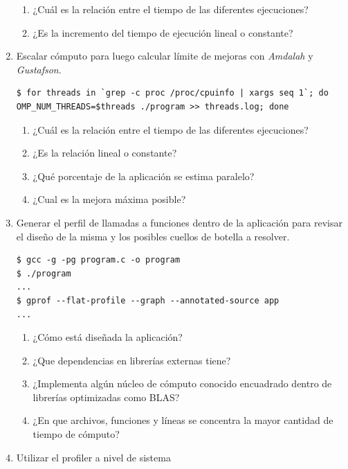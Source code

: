 \documentclass[a4paper]{report}
\begin{document}
\begin{enumerate}
\begin{enumerate}
\item ¿Cuál es la relación entre el tiempo de las diferentes ejecuciones?
\item ¿Es la incremento del tiempo de ejecución lineal o constante?
\end{enumerate}

\item Escalar cómputo para luego calcular límite de mejoras con {\it Amdalah} y {\it Gustafson}.

\begin{lstlisting}[caption={Escalamiento de Cómputo},label={lst:proc}]
$ for threads in `grep -c proc /proc/cpuinfo | xargs seq 1`; do OMP_NUM_THREADS=$threads ./program >> threads.log; done
\end{lstlisting}

\begin{enumerate}
\item ¿Cuál es la relación entre el tiempo de las diferentes ejecuciones?
\item ¿Es la relación lineal o constante?
\item ¿Qué porcentaje de la aplicación se estima paralelo?
\item ¿Cual es la mejora máxima posible?
\end{enumerate}

\item Generar el perfil de llamadas a funciones dentro de la aplicación para revisar el diseño de la misma y los posibles cuellos de botella a resolver.

\begin{lstlisting}[caption={Generación de Perfil de Rendimiento},label={lst:gprofall}]
$ gcc -g -pg program.c -o program
$ ./program
...
$ gprof --flat-profile --graph --annotated-source app
...
\end{lstlisting}

\begin{enumerate}
\item ¿Cómo está diseñada la aplicación?
\item ¿Que dependencias en librerías externas tiene?
\item ¿Implementa algún núcleo de cómputo conocido encuadrado dentro de librerías optimizadas como BLAS?
\item ¿En que archivos, funciones y líneas se concentra la mayor cantidad de tiempo de cómputo?
\end{enumerate}

\item Utilizar el profiler a nivel de sistema


\end{enumerate}
\end{document}
